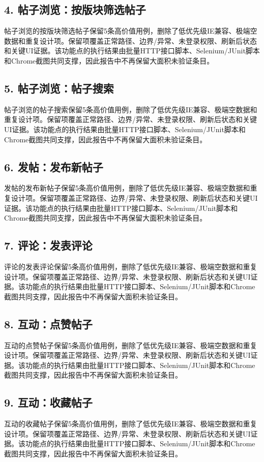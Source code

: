 \documentclass[UTF8,zihao=-4]{ctexart}
\begin{document}
\subsection{4. 帖子浏览：按版块筛选帖子}
帖子浏览的按版块筛选帖子保留5条高价值用例，删除了低优先级IE兼容、极端空数据和重复设计项。保留项覆盖正常路径、边界/异常、未登录权限、刷新后状态和关键UI证据。该功能点的执行结果由批量HTTP接口脚本、Selenium/JUnit脚本和Chrome截图共同支撑，因此报告中不再保留大面积未验证条目。

\subsection{5. 帖子浏览：帖子搜索}
帖子浏览的帖子搜索保留5条高价值用例，删除了低优先级IE兼容、极端空数据和重复设计项。保留项覆盖正常路径、边界/异常、未登录权限、刷新后状态和关键UI证据。该功能点的执行结果由批量HTTP接口脚本、Selenium/JUnit脚本和Chrome截图共同支撑，因此报告中不再保留大面积未验证条目。

\subsection{6. 发帖：发布新帖子}
发帖的发布新帖子保留5条高价值用例，删除了低优先级IE兼容、极端空数据和重复设计项。保留项覆盖正常路径、边界/异常、未登录权限、刷新后状态和关键UI证据。该功能点的执行结果由批量HTTP接口脚本、Selenium/JUnit脚本和Chrome截图共同支撑，因此报告中不再保留大面积未验证条目。

\subsection{7. 评论：发表评论}
评论的发表评论保留5条高价值用例，删除了低优先级IE兼容、极端空数据和重复设计项。保留项覆盖正常路径、边界/异常、未登录权限、刷新后状态和关键UI证据。该功能点的执行结果由批量HTTP接口脚本、Selenium/JUnit脚本和Chrome截图共同支撑，因此报告中不再保留大面积未验证条目。

\subsection{8. 互动：点赞帖子}
互动的点赞帖子保留5条高价值用例，删除了低优先级IE兼容、极端空数据和重复设计项。保留项覆盖正常路径、边界/异常、未登录权限、刷新后状态和关键UI证据。该功能点的执行结果由批量HTTP接口脚本、Selenium/JUnit脚本和Chrome截图共同支撑，因此报告中不再保留大面积未验证条目。

\subsection{9. 互动：收藏帖子}
互动的收藏帖子保留5条高价值用例，删除了低优先级IE兼容、极端空数据和重复设计项。保留项覆盖正常路径、边界/异常、未登录权限、刷新后状态和关键UI证据。该功能点的执行结果由批量HTTP接口脚本、Selenium/JUnit脚本和Chrome截图共同支撑，因此报告中不再保留大面积未验证条目。
\end{document}
